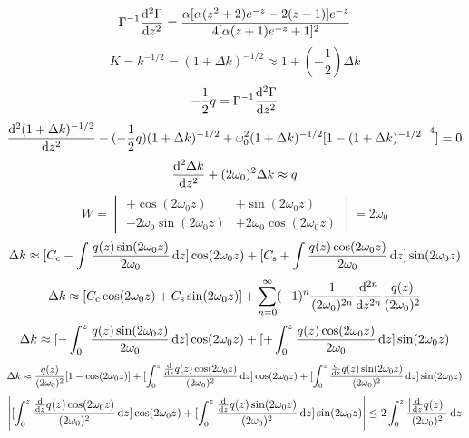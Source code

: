 \begin{equation}
    \Gamma^{-1}\frac{\mathrm{d}^2\Gamma}{\mathrm{d} z^2}=\frac{\alpha[\alpha(z^2+2)e^{-z}-2(z-1)]e^{-z}}{4[\alpha(z+1)e^{-z}+1]^2}
\end{equation}
\begin{equation}
    K=k^{-1/2}=(1+\Delta k)^{-1/2}\approx1+(-\frac{1}{2})\Delta k
\end{equation}
\begin{equation}
    -\frac{1}{2}q=\Gamma^{-1}\frac{\mathrm{d}^2\Gamma}{\mathrm{d} z^2}
\end{equation}
\begin{equation}
    \frac{\mathrm{d}^2 (1+\Delta k)^{-1/2}}{\mathrm{d} z^2}-(-\frac{1}{2}q)(1+\Delta k)^{-1/2}+\omega_0^2(1+\Delta k)^{-1/2}[1-{(1+\Delta k)^{-1/2}}^{-4}]=0
\end{equation}
\begin{equation}
    \frac{\mathrm{d}^2 \Delta k}{\mathrm{d} z^2}+(2\omega_0)^2\Delta k\approx q
\end{equation}
\begin{equation}
    W=\begin{vmatrix}+\cos(2\omega_0z)&+\sin(2\omega_0z)\\-2\omega_0\sin(2\omega_0z)&+2\omega_0\cos(2\omega_0z)\end{vmatrix}=2\omega_0
\end{equation}
\begin{equation}
    \Delta k\approx[C_\text{c}-\int\frac{q(z)\sin(2\omega_0z)}{2\omega_0}\,\mathrm{d} z]\cos(2\omega_0z)+[C_\text{s}+\int\frac{q(z)\cos(2\omega_0z)}{2\omega_0}\,\mathrm{d} z]\sin(2\omega_0z)
\end{equation}
\begin{equation}
    \Delta k\approx[C_\text{c}\cos(2\omega_0z)+C_\text{s}\sin(2\omega_0z)]+\sum_{n=0}^{\infty}(-1)^{n}\frac{1}{(2\omega_0)^{2n}}\frac{\mathrm{d}^{2n}}{\mathrm{d} z^{2n}}\frac{q(z)}{(2\omega_0)^2}
\end{equation}
\begin{equation}
    \Delta k\approx[-\int_0^z\frac{q(z)\sin(2\omega_0z)}{2\omega_0}\,\mathrm{d} z]\cos(2\omega_0z)+[+\int_0^z\frac{q(z)\cos(2\omega_0z)}{2\omega_0}\,\mathrm{d} z]\sin(2\omega_0z)
\end{equation}
\begin{equation}
    \Delta k\approx\frac{q(z)}{(2\omega_0)^2}[1-\cos(2\omega_0z)]+[\int_0^z\frac{\frac{\mathrm{d}}{\mathrm{d} z}q(z)\cos(2\omega_0z)}{(2\omega_0)^2}\,\mathrm{d} z]\cos(2\omega_0z)+[\int_0^z\frac{\frac{\mathrm{d}}{\mathrm{d} z}q(z)\sin(2\omega_0z)}{(2\omega_0)^2}\,\mathrm{d} z]\sin(2\omega_0z)
\end{equation}
\begin{equation}
    \left\lvert [\int_0^z\frac{\frac{\mathrm{d}}{\mathrm{d} z}q(z)\cos(2\omega_0z)}{(2\omega_0)^2}\,\mathrm{d} z]\cos(2\omega_0z)+[\int_0^z\frac{\frac{\mathrm{d}}{\mathrm{d} z}q(z)\sin(2\omega_0z)}{(2\omega_0)^2}\,\mathrm{d} z]\sin(2\omega_0z)\right\rvert \le2\int_0^z\frac{\left\lvert\frac{\mathrm{d}}{\mathrm{d} z}q(z)\right\rvert}{(2\omega_0)^2}\,\mathrm{d} z
\end{equation}
